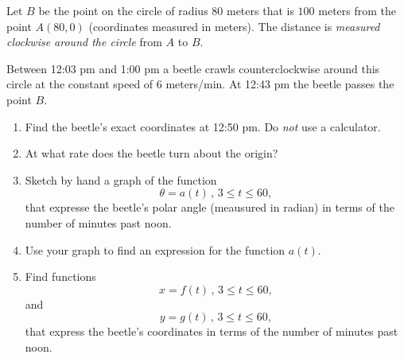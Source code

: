 \documentclass{ximera}
\begin{document}
\begin{example}  \label{Exdsfdsftt394}

Let $B$ be the point on the circle of radius $80$ meters that is $100$ meters from the point $A(80,0)$  (coordinates measured in meters). The distance is \emph{measured \emph{clockwise} around the circle} from $A$ to $B$. 

Between 12:03 pm and 1:00 pm a beetle crawls counterclockwise around this circle at the constant speed of $6$ meters/min. At 12:43 pm the beetle passes the point $B$. 

\begin{enumerate}

\item Find the beetle's exact coordinates at 12:50 pm. Do \emph{not} use a calculator.

\item At what rate does the beetle turn about the origin?

\item Sketch by hand a graph of the function 
\[
   \theta = a(t) \, , \, 3\leq t \leq 60 ,
\]
that expresse the beetle's polar angle (meausured in radian) in terms of the number of minutes past noon.

\item Use your graph to find an expression for the function $a(t)$.

\item Find functions
\[
     x = f(t)  \, , \, 3\leq t \leq 60 ,
\]
and
\[
     y = g(t)  \, , \, 3\leq t \leq 60 ,
\]
that express the beetle's coordinates in terms of the number of minutes past noon.


\end{enumerate}

\end{example}
\end{document}
